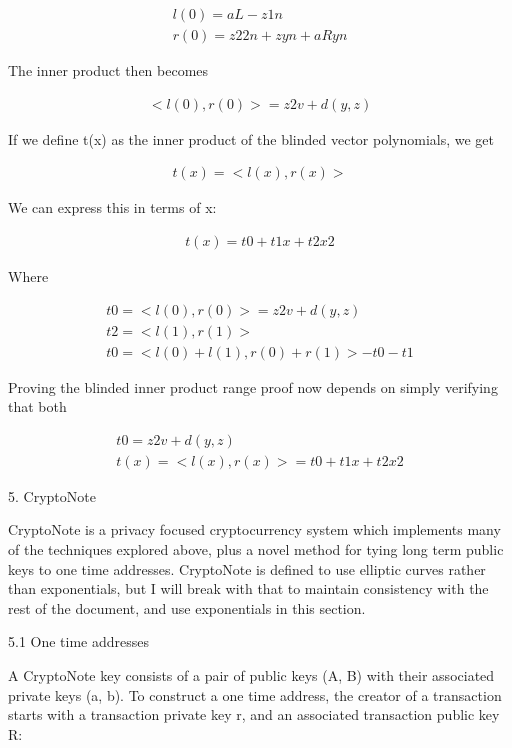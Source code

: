 \documentclass{article}
\begin{document}
\begin{eqnarray}
  l(0) = aL - z 1n\\
  r(0) = z2 2n + z yn + aRyn
\end{eqnarray}

The inner product then becomes

\begin{eqnarray}
  <l(0), r(0)> = z2 v + d(y,z)
\end{eqnarray}

If we define t(x) as the inner product of the blinded vector polynomials, we get

\begin{eqnarray}
  t(x) = <l(x), r(x)> 
\end{eqnarray}

We can express this in terms of x:

\begin{eqnarray}
  t(x) = t0 + t1 x + t2 x2
\end{eqnarray}

Where

\begin{eqnarray}
  t0 = <l(0), r(0)> = z2 v + d(y,z)\\
  t2 = <l(1), r(1)>\\
  t0 = <l(0) + l(1), r(0) + r(1)> - t0 - t1
\end{eqnarray}

Proving the blinded inner product range proof now depends on simply verifying that both 

\begin{eqnarray}
  t0 = z2 v + d(y,z)\\
  t(x) = <l(x), r(x)> = t0 + t1 x + t2 x2
\end{eqnarray}


5. CryptoNote

CryptoNote is a privacy focused cryptocurrency system which implements many of the techniques explored above, plus a novel method for tying long term public keys to one time addresses.  CryptoNote is defined to use elliptic curves rather than exponentials, but I will break with that to maintain consistency with the rest of the document, and use exponentials in this section.


5.1 One time addresses

A CryptoNote key consists of a pair of public keys (A, B) with their associated private keys (a, b).  To construct a one time address, the creator of a transaction starts with a transaction private key r, and an associated transaction public key R:
\end{document}
